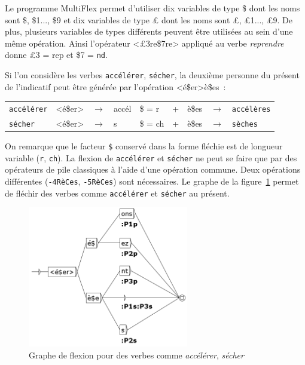 \bigskip
\noindent
Le programme MultiFlex permet d'utiliser dix variables de type \$ dont les noms sont \$, \$1..., \$9
et dix variables de type {\pounds} dont les noms sont {\pounds}, {\pounds}1..., {\pounds}9. De plus,
plusieurs variables de types différents peuvent \^etre utilisées au sein d'une m\^eme opération.
Ainsi l'opérateur <{\pounds}3re\$7re> appliqué au verbe {\it reprendre} donne {\pounds}3 = 
 rep et \$7 = \verb+nd+.

\bigskip
\noindent
Si l'on considère les verbes \verb+accélérer+, \verb+sécher+, la
deuxième personne du présent de l'indicatif peut \^etre générée par l'opération <é\$er>è\$es~:

\begin{center}
\begin{tabular}{lllllllll}
	\verb+accélérer+ & <é\$er> & $\rightarrow$ & accél & \$ = r & + & è\$es &  $\rightarrow$ & \verb+accélères+\\
	\verb+sécher+ & <é\$er> & $\rightarrow$ & s & \$ = ch & + & è\$es & $\rightarrow$ & \verb+sèches+\\
\end{tabular}
\end{center}

\noindent
On remarque que le facteur \verb+$+ conservé dans la forme fléchie est de longueur variable (\verb+r+, \verb+ch+). 
La flexion de \verb+accélérer+ et \verb+sécher+ ne peut se faire que par des opérateurs de pile
classiques \`a l'aide d'une opération commune. Deux opérations différentes (\verb+-4RèCes+, \verb+-5RèCes+) sont
nécessaires. Le graphe de la figure~\ref{fig-inflection-secher} permet de fléchir des verbes comme
\verb+accélérer+ et \verb+sécher+ au présent.

\begin{figure}[!ht]
\begin{center}
\includegraphics[width=7cm]{resources/img/fig3-Advanced_operators_with_Variables-V_secher.png}
\caption{Graphe de flexion pour des verbes comme {\it accélérer}, {\it sécher}
\label{fig-inflection-secher}}
\end{center}
\end{figure}

